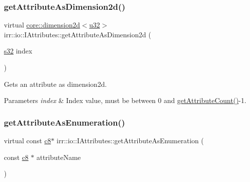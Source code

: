 \subsubsection{\texorpdfstring{get\+Attribute\+As\+Dimension2d()}{getAttributeAsDimension2d()}\hspace{0.1cm}{\footnotesize\ttfamily [2/2]}}
{\footnotesize\ttfamily virtual \hyperlink{classirr_1_1core_1_1dimension2d}{core\+::dimension2d}$<$\hyperlink{namespaceirr_a0416a53257075833e7002efd0a18e804}{u32}$>$ irr\+::io\+::\+I\+Attributes\+::get\+Attribute\+As\+Dimension2d (\begin{DoxyParamCaption}\item[{\hyperlink{namespaceirr_ac66849b7a6ed16e30ebede579f9b47c6}{s32}}]{index }\end{DoxyParamCaption})\hspace{0.3cm}{\ttfamily [pure virtual]}}



Gets an attribute as dimension2d. 


\begin{DoxyParams}{Parameters}
{\em index} & Index value, must be between 0 and \hyperlink{classirr_1_1io_1_1IAttributes_a796bdd9440ee7ba0b6742a90a82870b6}{get\+Attribute\+Count()}-\/1. \\
\hline
\end{DoxyParams}
\mbox{\label{classirr_1_1io_1_1IAttributes_a2a204c332735a0b15fa555ae6e785214}} 
\subsubsection{\texorpdfstring{get\+Attribute\+As\+Enumeration()}{getAttributeAsEnumeration()}\hspace{0.1cm}{\footnotesize\ttfamily [1/4]}}
{\footnotesize\ttfamily virtual const \hyperlink{namespaceirr_a9395eaea339bcb546b319e9c96bf7410}{c8}$\ast$ irr\+::io\+::\+I\+Attributes\+::get\+Attribute\+As\+Enumeration (\begin{DoxyParamCaption}\item[{const \hyperlink{namespaceirr_a9395eaea339bcb546b319e9c96bf7410}{c8} $\ast$}]{attribute\+Name }\end{DoxyParamCaption})\hspace{0.3cm}{\ttfamily [pure virtual]}}



